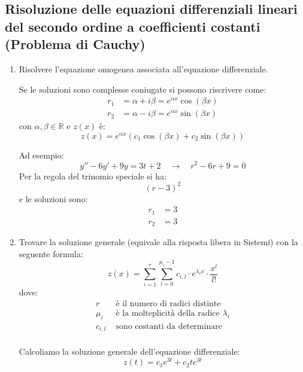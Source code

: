 \documentclass{article}
\begin{document}
\subsection{Risoluzione delle equazioni differenziali lineari del secondo ordine a
coefficienti costanti (Problema di Cauchy)}
\begin{enumerate}
  \item Risolvere l'equazione omogenea associata all'equazione differenziale.

    Se le soluzioni sono complesse coniugate si possono riscrivere come:
    \[
      \begin{aligned}
        r_1 &= \alpha + i \beta = e^{\alpha x} \cos(\beta x) \\
        r_2 &= \alpha - i \beta = e^{\alpha x} \sin(\beta x)
      \end{aligned}
    \] 
    con \( \alpha, \beta \in \mathbb{R} \) e \( z(x) \) è:
    \[
      z(x) = e^{\alpha x} \left( c_1 \cos(\beta x) + c_2 \sin(\beta x) \right)
    \] 

    \begin{example}
      Ad esempio:
      \[
        y''-6y'+9y = 3t+2 \quad \to \quad r^2 - 6r + 9 = 0
      \] 
      Per la regola del trinomio speciale si ha:
      \[
        \left( r-3 \right)^2
      \] 
      e le soluzioni sono:
      \[
        \begin{aligned}
          r_1 &= 3 \\
          r_2 &= 3
        \end{aligned}
      \] 
    \end{example}

  \item Trovare la soluzione generale (equivale alla risposta libera in Sistemi)
    con la seguente formula:
      \[
        z(x) = \sum_{i=1}^{r} \sum_{l=0}^{\mu_i -1} c_{i,l} \cdot 
        e^{\lambda_i x} \cdot \frac{x^l}{l!}
      \] 
      dove:
      \[
      \begin{aligned}
        r &\text{ è il numero di radici distinte} \\
        \mu_i &\text{ è la molteplicità della radice } \lambda_i \\
        c_{i,l} &\text{ sono costanti da determinare} \\
      \end{aligned}
      \] 
    \begin{example}
      Calcoliamo la soluzione generale dell'equazione differenziale:
      \[
        z(t) = c_1 e^{3t} + c_2 t e^{3t}
      \] 
    \end{example}


\end{enumerate}
\end{document}
